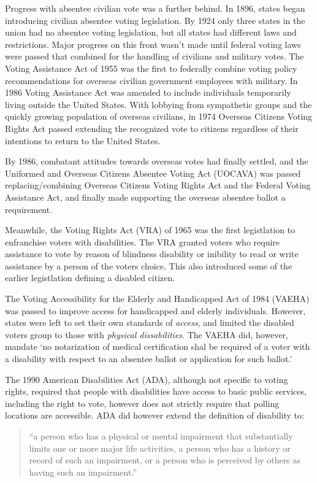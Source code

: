 Progress with absentee civilian vote was a further behind. In 1896, states began introducing civilian absentee voting legislation. By 1924 only three states in the union had no absentee voting legislation, but all states had different laws and restrictions. Major progress on this front wasn't made until federal voting laws were passed that combined for the handling of civilians and military votes. The Voting Assistance Act of 1955 was the first to federally combine voting policy recommendations for overseas civilian government employees with military. In 1986 Voting Assistance Act was amended to include individuals temporarily living outside the United States. With lobbying from sympathetic groups and the quickly growing population of overseas civilians, in 1974 Overseas Citizens Voting Rights Act passed extending the recognized vote to citizens regardless of their intentions to return to the United States.

By 1986, combatant attitudes towards overseas votes had finally settled, and the Uniformed and Overseas Citizens Absentee Voting Act (UOCAVA) was passed replacing/combining Overseas Citizens Voting Rights Act and the Federal Voting Assistance Act, and finally made supporting the overseas absentee ballot a requirement.

Meanwhile, the Voting Rights Act (VRA) of 1965 was the first legistlation to enfranchise voters with disabilities. The VRA granted voters who require assistance to vote by reason of blindness disability or inibility to read or write assistance by a person of the voters choice. This also introduced some of the earlier legistlation defining a disabled citizen.

The Voting Accessibility for the Elderly and Handicapped Act of 1984 (VAEHA) was passed to improve access for handicapped and elderly individuals. However, states were left to set their own standards of {\em access}, and limited the disabled voters group to those with {\em physical dissabilities}. The VAEHA did, however, mandate `no notarization of medical certification shal be required of a voter with a disability with respect to an absentee ballot or application for such ballot.'

The 1990 American Disabilities Act (ADA), although not specific to voting rights, required that people with disabilities have access to basic public services, including the right to vote, however does not strictly require that polling locations are accessible. ADA did however extend the definition of disability to:
\begin{quote}``a person who has a physical or mental impairment that substantially limits one or more major life activities, a person who has a history or record of such an impairment, or a person who is perceived by others as having such an impairment.''
\end{quote}

